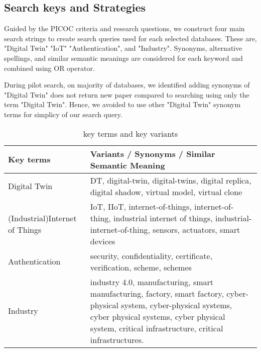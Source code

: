 \subsection{Search keys and Strategies}
Guided by the PICOC criteria and  research questions, we construct four main search strings to create search queries used for each selected databases. These are, "Digital Twin" "IoT" "Authentication", and "Industry". Synonyms, alternative spellings, and similar semantic meanings are considered for each keyword and combined using OR operator. 

During pilot search, on majority of databases, we identified adding synonyms of "Digital Twin" does not return new paper compared to searching using only the term "Digital Twin". Hence, we avoided to use other "Digital Twin" synonym terms for simplicy of our search query. 

\begin{table}[h]
\caption{ key terms and key variants}
\begin{NiceTabular}{p{3.2cm}p{11cm}}
\toprule
    \textbf{Key terms} & \textbf{Variants / Synonyms / Similar Semantic Meaning} \\
    \midrule
    Digital Twin & DT, digital-twin, digital-twins, digital replica, digital shadow, virtual model, virtual clone \\ \hline
    (Industrial)Internet of Things & IoT, IIoT, internet-of-things, internet-of-thing, industrial internet of things, industrial-internet-of-thing, sensors, actuators, smart devices  \\ \hline
    Authentication & security, confidentiality, certificate, verification, scheme, schemes\\ \hline
    Industry & industry 4.0, manufacturing, smart manufacturing, factory, smart factory, cyber-physical system, cyber-physical systems, cyber physical systems, cyber physical system, critical infrastructure, critical infrastructures. \\ 
\bottomrule
\end{NiceTabular}
\end{table}

